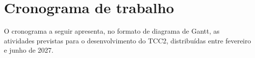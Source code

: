 \documentclass[
    12pt,                %
    openright,           %
    oneside,             %
    a4paper,             %
    english,             %
    brazil               %
]{abntex2}
\makeatletter
\renewcommand{\ABNTEXfontereduzida}{\fontsize{10}{12}\selectfont}
\renewcommand{\legend}[1]{%
  \M@gettitle{#1}%
  \memlegendinfo{#1}%
  \par
  \begingroup
    \@parboxrestore
    \if@minipage
      \@setminipage
    \fi
    \ABNTEXfontereduzida
    \captiondelim{\mbox{}}%
    \@makecaption{}{\ignorespaces #1}\par
  \endgroup}
\makeatother
\begin{document}










\section{Cronograma de trabalho}
\label{sec:cronograma}

O cronograma a seguir apresenta, no formato de diagrama
de Gantt, as atividades previstas para o desenvolvimento
do TCC2, distribuídas entre fevereiro e junho de 2027.
\end{document}
